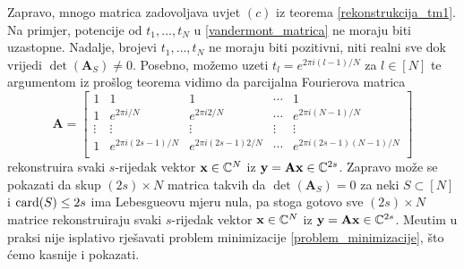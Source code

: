 \documentclass[a4paper,twoside,12pt]{memoir} %
\newcommand{\vect}[1]{\mathbf{#1}}
\renewcommand{\vec}{\vect}
\newcommand{\card}{\text{\normalfont{card}}}
\begin{document}
\indent Zapravo, mnogo matrica zadovoljava uvjet $(c)$ iz teorema \eqref{rekonstrukcija_tm1}. Na primjer, potencije od $t_1,\dots,t_N$ u \eqref{vandermont_matrica} ne moraju biti uzastopne. Nadalje, brojevi $t_1,\dots,t_N$ ne moraju biti pozitivni, niti realni sve dok vrijedi $\det(\vec A_S) \neq 0$. Posebno, mo\v{z}emo uzeti $t_l = e^{2\pi i (l-1)/N}$ za $l \in [N]$ te argumentom iz pro\v{s}log teorema vidimo da parcijalna Fourierova matrica
\begin{equation*}
   \vec A = 
   \begin{bmatrix*}
       1 & 1 & 1 & \cdots & 1 \\
       1 & e^{2 \pi i/ N} & e^{2 \pi i2/ N} & \cdots & e^{2 \pi i(N-1)/ N} \\ 
       \vdots & \vdots & \vdots & \vdots & \vdots \\ 
       1 & e^{2 \pi i(2s-1)/ N} & e^{2 \pi i(2s-1)2/ N} & \cdots & e^{2 \pi i(2s-1)(N-1)/ N} \\ 
   \end{bmatrix*}
\end{equation*}
rekonstruira svaki $s$-rijedak vektor $\vec x \in \C^N$ iz $\vec y = \vec{Ax} \in \C^{2s}$.
Zapravo mo\v{z}e se pokazati da skup $(2s) \times N$ matrica takvih da $\det(\vec A_S) = 0$ za neki $S \subset [N]$ i $\card(S) \leq 2s$ ima Lebesgueovu mjeru nula, pa stoga gotovo sve $(2s) \times N$ matrice rekonstruiraju svaki $s$-rijedak vektor $\vec x \in \C^N$ iz $\vec y = \vec{Ax} \in \C^{2s}$. Me\dj utim u praksi nije isplativo rje\v{s}avati problem minimizacije \eqref{problem_minimizacije}, \v{s}to \'cemo kasnije i pokazati.
\end{document}
